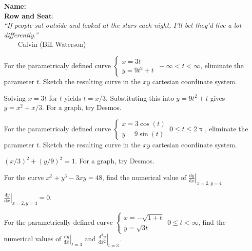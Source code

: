 \documentclass[12pt,fleqn,answers]{exam}
\newcommand{\class}{MATH 202, Fall \the\year}
\begin{document}
\large
\noindent\makebox[3.0truein][l]{\textbf{\class}}
\textbf{Name:} \hrulefill \\
\noindent {}
\textbf{Row and Seat}:\hrulefill\\





\noindent \emph{“If people sat outside and looked at 
the stars each night, I’ll bet they’d live a lot differently.”}\\
  $\phantom{xxx}$ \hfill {\sc Calvin (Bill Waterson)}


\begin{questions} 
    
  
\question For the parametricaly defined curve $\begin{cases}
      x = 3 t \\ y = 9 t^2 + t \end{cases} \, -\infty < t < \infty$,
      eliminate the parameter $t$. Sketch the resulting curve in
      the $xy$ cartesian coordinate system.

\begin{solution}[2.5in] Solving $  x = 3 t$ for $t$ yields $t = x/3$.
  Substituting this into  $y = 9 t^2 + t$ gives $y = x^2 + x / 3$.
  For a graph, try Desmos.
\end{solution}

\question For the parametricaly defined curve $\begin{cases}
    x = 3 \cos(t) \\ y = 9 \sin(t) \end{cases} \, 0 \leq  t \leq 2 \uppi$,
    eliminate the parameter $t$. Sketch the resulting curve in
    the $xy$ cartesian coordinate system.

\begin{solution}%
  $(x/3)^2 + (y/9)^2 = 1$.  For a graph, try Desmos.
\end{solution}

\newpage


\question For the curve $x^3 + y^3 - 3 x y = 48$, find the 
numerical value of $\displaystyle 
\left . \frac{\mathrm{d} y}{\mathrm{d}x} \right |_{x=2,y=4}$
\begin{solution}[3.5in]
  $\left . \frac{\mathrm{d} y}{\mathrm{d}x} \right |_{x=2,y=4} = 0$.
\end{solution}

\question For the parametrically defined curve 
$\displaystyle \begin{cases} x = -\sqrt{1+t} \\ y = \sqrt{3t} 
\end{cases} \, 0 \leq t < \infty$, find the numerical values 
of $\left . \frac{\mathrm{d} y}{\mathrm{d}x} \right |_{t=3}$
and $\left . \frac{\mathrm{d}^2 y}{\mathrm{d} x^2} \right |_{t=3}$.


\end{questions}
\end{document}
